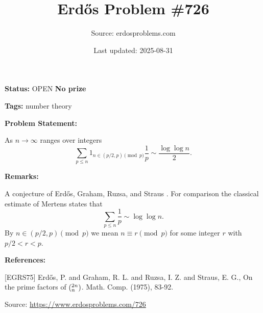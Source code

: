\documentclass{article}
\title{Erd\H{o}s Problem \#726}
\date{Last updated: 2025-08-31}
\author{Source: erdosproblems.com}
\begin{document}
\maketitle

\noindent\textbf{Status:} OPEN \quad \textbf{No prize}

\noindent\textbf{Tags:} number theory

\medskip
\noindent\textbf{Problem Statement:}

As $n\to \infty$ ranges over integers\[\sum_{p\leq n}1_{n\in (p/2,p)\pmod{p}}\frac{1}{p}\sim \frac{\log\log n}{2}.\]

\bigskip
\noindent\textbf{Remarks:}

A conjecture of Erd\H{o}s, Graham, Ruzsa, and Straus \cite{EGRS75}. For comparison the classical estimate of Mertens states that\[\sum_{p\leq n}\frac{1}{p}\sim \log\log n.\]By $n\in (p/2,p)\pmod{p}$ we mean $n\equiv r\pmod{p}$ for some integer $r$ with $p/2<r<p$.

\bigskip
\noindent\textbf{References:}

[EGRS75] Erd\H{o}s, P. and Graham, R. L. and Ruzsa, I. Z. and Straus, E. G., On the prime factors of $(\sp{2n}\sb{n})$. Math. Comp. (1975), 83-92.

\bigskip
\noindent\small{Source: \url{https://www.erdosproblems.com/726}}
\end{document}
